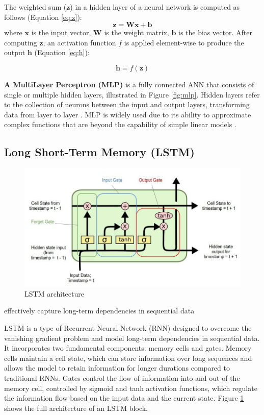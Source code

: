 The weighted sum (\( \mathbf{z} \)) in a hidden layer of a neural network is computed as follows (Equation \eqref{eq:z}):
\begin{equation}
    \label{eq:z}
    \mathbf{z} = \mathbf{W}\mathbf{x} + \mathbf{b}
\end{equation} where \( \mathbf{x} \) is the input vector, \( \mathbf{W} \) is the weight matrix, \( \mathbf{b} \) is the bias vector. After computing \( \mathbf{z} \), an activation function \( f \) is applied element-wise to produce the output \( \mathbf{h} \) (Equation \eqref{eq:h}):

\begin{equation}
    \label{eq:h}
    \mathbf{h} = f(\mathbf{z})
\end{equation}

\textbf{A MultiLayer Perceptron (MLP)} is a fully connected ANN that consists of single or multiple hidden layers, illustrated in Figure \ref{fig:mlp}. Hidden layers refer to the collection of neurons between the input and output layers, transforming data from layer to layer \cite{uzair-2020-hidden-layers}. MLP is widely used due to its ability to approximate complex functions that are beyond the capability of simple linear models \cite{popescue-2009-mlp}.

\subsection{Long Short-Term Memory (LSTM)}

\begin{figure}[htbp]
    \centering
    \includegraphics[width=0.8\linewidth]{images/lstm.jpeg}
    \caption{LSTM architecture \cite{rahman-2023-lstm-networks}}
    \label{fig:lstm}
\end{figure}

effectively capture long-term dependencies in sequential data

LSTM \cite{hochreiter-1997-lstm} is a type of Recurrent Neural Network (RNN) designed to overcome the vanishing gradient problem and model long-term dependencies in sequential data. It incorporates two fundamental components: memory cells and gates. Memory cells maintain a cell state, which can store information over long sequences and allows the model to retain information for longer durations compared to traditional RNNs. Gates control the flow of information into and out of the memory cell, controlled by sigmoid and tanh activation functions, which regulate the information flow based on the input data and the current state. Figure \ref{fig:lstm} shows the full architecture of an LSTM block.

